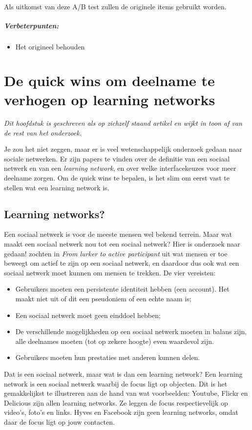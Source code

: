 \documentclass[a4paper, 10pt, pdftex]{report}
\begin{document}
      Als uitkomst van deze A/B test zullen de originele items gebruikt worden.

    \paragraph{\textbf{Verbeterpunten:}}
      \begin{itemize}
        \item Het origineel behouden
      \end{itemize}

  \newpage
  \chapter{De quick wins om deelname te verhogen op learning networks}
    \emph{Dit hoofdstuk is geschreven als op zichzelf staand artikel en wijkt in toon af van de rest van het onderzoek.}

    Je zou het niet zeggen, maar er is veel wetenschappelijk onderzoek gedaan naar sociale netwerken. Er zijn papers te vinden over de definitie van een sociaal netwerk en van een \emph{learning network}, en over welke interfacekeuzes voor meer deelname zorgen. Om de quick wins te bepalen, is het slim om eerst vast te stellen wat een learning network is.

    \section{Learning networks?}
    Een sociaal netwerk is voor de meeste mensen wel bekend terrein. Maar wat maakt een sociaal netwerk nou tot een sociaal netwerk? Hier is onderzoek naar gedaan! \cite{Sloep2009} zochten in \emph{From lurker to active participant} uit wat mensen er toe beweegt om actief te zijn op een sociaal netwerk, en daardoor dus ook wat een sociaal netwerk moet kunnen om mensen te trekken. De vier vereisten:
      \begin{itemize}
        \item Gebruikers moeten een persistente identiteit hebben (een account). Het maakt niet uit of dit een pseudoniem of een echte naam is;
        \item Een sociaal netwerk moet geen einddoel hebben;
        \item De verschillende mogelijkheden op een sociaal netwerk moeten in balans zijn, alle deelnames moeten (tot op zekere hoogte) even waardevol zijn.
        \item Gebruikers moeten hun prestaties met anderen kunnen delen.
      \end{itemize}
    Dat is een sociaal netwerk, maar wat is dan een learning network? Een learning network is een sociaal netwerk waarbij de focus ligt op objecten. Dit is het gemakkelijkst te illustreren aan de hand van wat voorbeelden: Youtube, Flickr en Delicious zijn allen learning networks. Ze leggen de focus respectievelijk op video's, foto's en links. Hyves en Facebook zijn geen learning networks, omdat daar de focus ligt op jouw contacten.
\end{document}

